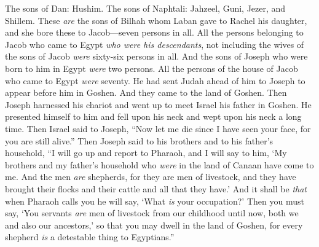 \begin{biblechapter}
\verse The sons of Dan: Hushim.
\verse The sons of Naphtali: Jahzeel, Guni, Jezer, and Shillem.
\verse These \textit{are} the sons of Bilhah whom Laban gave to Rachel his daughter, and she bore these to Jacob—seven persons in all.
\verse All the persons belonging to Jacob who came to Egypt \textit{who were his descendants}, not including the wives of the sons of Jacob \textit{were} sixty-six persons in all.
\verse And the sons of Joseph who were born to him in Egypt \textit{were} two persons. All the persons of the house of Jacob who came to Egypt \textit{were} seventy.
\verse He had sent Judah ahead of him to Joseph to appear before him in Goshen. And they came to the land of Goshen.
\verse Then Joseph harnessed his chariot and went up to meet Israel his father in Goshen. He presented himself to him and fell upon his neck and wept upon his neck a long time.
\verse Then Israel said to Joseph, “Now let me die since I have seen your face, for you are still alive.”
\verse Then Joseph said to his brothers and to his father’s household, “I will go up and report to Pharaoh, and I will say to him, ‘My brothers and my father’s household who \textit{were} in the land of Canaan have come to me.
\verse And the men \textit{are} shepherds, for they are men of livestock, and they have brought their flocks and their cattle and all that they have.’
\verse And it shall be \textit{that} when Pharaoh calls you he will say, ‘What \textit{is} your occupation?’
\verse Then you must say, ‘You servants \textit{are} men of livestock from our childhood until now, both we and also our ancestors,’ so that you may dwell in the land of Goshen, for every shepherd \textit{is} a detestable thing to Egyptians.”
\end{biblechapter}

